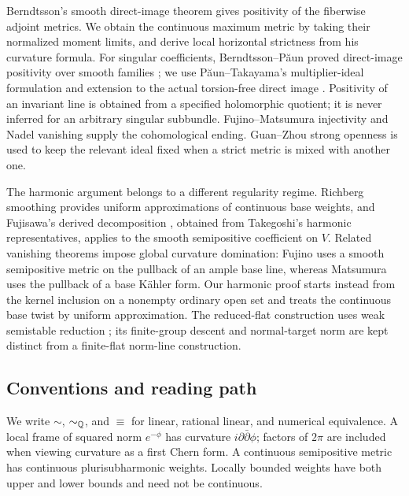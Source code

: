 Berndtsson's smooth direct-image theorem \cite{Berndtsson2009} gives positivity of the fiberwise adjoint metrics. We obtain the continuous maximum metric by taking their normalized moment limits, and derive local horizontal strictness from his curvature formula. For singular coefficients, Berndtsson--P\u aun proved direct-image positivity over smooth families \cite[Theorem~3.5]{BP2008}; we use P\u aun--Takayama's multiplier-ideal formulation and extension to the actual torsion-free direct image \cite[Theorems~3.3.4--3.3.5]{PT2018}. Positivity of an invariant line is obtained from a specified holomorphic quotient; it is never inferred for an arbitrary singular subbundle. Fujino--Matsumura injectivity \cite{FM2016} and Nadel vanishing \cite{Nadel1990} supply the cohomological ending. Guan--Zhou strong openness \cite{GuanZhou2015} is used to keep the relevant ideal fixed when a strict metric is mixed with another one.

The harmonic argument belongs to a different regularity regime. Richberg smoothing \cite{Richberg1968} provides uniform approximations of continuous base weights, and Fujisawa's derived decomposition \cite[Theorem~1]{Fujisawa2015}, obtained from Takegoshi's harmonic representatives, applies to the smooth semipositive coefficient on $V$. Related vanishing theorems impose global curvature domination: Fujino \cite[Theorem~1.3]{Fujino2018} uses a smooth semipositive metric on the pullback of an ample base line, whereas Matsumura \cite[Theorem~1.3]{Matsumura2018} uses the pullback of a base K\"ahler form. Our harmonic proof starts instead from the kernel inclusion on a nonempty ordinary open set and treats the continuous base twist by uniform approximation. The reduced-flat construction uses weak semistable reduction \cite{AK2000}; its finite-group descent and normal-target norm are kept distinct from a finite-flat norm-line construction.

\subsection{Conventions and reading path}
We write $\sim$, $\sim_{\mathbb Q}$, and $\equiv$ for linear, rational linear, and numerical equivalence. A local frame of squared norm $e^{-\phi}$ has curvature $i\partial\bar\partial\phi$; factors of $2\pi$ are included when viewing curvature as a first Chern form. A continuous semipositive metric has continuous plurisubharmonic weights. Locally bounded weights have both upper and lower bounds and need not be continuous.

